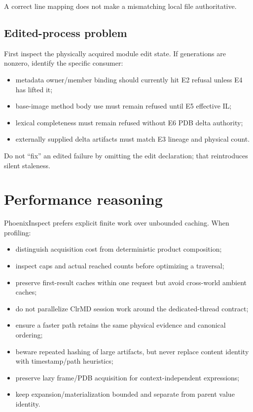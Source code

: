 \documentclass[11pt,oneside,openany]{book}
\begin{document}
A correct line mapping does not make a mismatching local file authoritative.

\subsection{Edited-process problem}

First inspect the physically acquired module edit state. If generations are nonzero, identify the specific consumer:

\begin{itemize}
  \item metadata owner/member binding should currently hit E2 refusal unless E4 has lifted it;
  \item base-image method body use must remain refused until E5 effective IL;
  \item lexical completeness must remain refused without E6 PDB delta authority;
  \item externally supplied delta artifacts must match E3 lineage and physical count.
\end{itemize}

Do not ``fix'' an edited failure by omitting the edit declaration; that reintroduces silent staleness.

\section{Performance reasoning}

PhoenixInspect prefers explicit finite work over unbounded caching. When profiling:

\begin{itemize}
  \item distinguish acquisition cost from deterministic product composition;
  \item inspect caps and actual reached counts before optimizing a traversal;
  \item preserve first-result caches within one request but avoid cross-world ambient caches;
  \item do not parallelize ClrMD session work around the dedicated-thread contract;
  \item ensure a faster path retains the same physical evidence and canonical ordering;
  \item beware repeated hashing of large artifacts, but never replace content identity with timestamp/path heuristics;
  \item preserve lazy frame/PDB acquisition for context-independent expressions;
  \item keep expansion/materialization bounded and separate from parent value identity.
\end{itemize}
\end{document}
